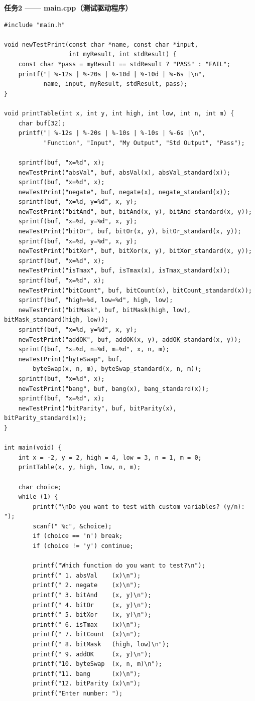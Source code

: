 \documentclass[12pt,a4paper]{ctexart}
\begin{document}
\vspace{0.3cm}
\textbf{任务2 —— main.cpp（测试驱动程序）}

\begin{lstlisting}[basicstyle=\ttfamily\zihao{5},lineskip=-1pt]
#include "main.h"

void newTestPrint(const char *name, const char *input,
                  int myResult, int stdResult) {
    const char *pass = myResult == stdResult ? "PASS" : "FAIL";
    printf("| %-12s | %-20s | %-10d | %-10d | %-6s |\n",
           name, input, myResult, stdResult, pass);
}

void printTable(int x, int y, int high, int low, int n, int m) {
    char buf[32];
    printf("| %-12s | %-20s | %-10s | %-10s | %-6s |\n",
           "Function", "Input", "My Output", "Std Output", "Pass");

    sprintf(buf, "x=%d", x);
    newTestPrint("absVal", buf, absVal(x), absVal_standard(x));
    sprintf(buf, "x=%d", x);
    newTestPrint("negate", buf, negate(x), negate_standard(x));
    sprintf(buf, "x=%d, y=%d", x, y);
    newTestPrint("bitAnd", buf, bitAnd(x, y), bitAnd_standard(x, y));
    sprintf(buf, "x=%d, y=%d", x, y);
    newTestPrint("bitOr", buf, bitOr(x, y), bitOr_standard(x, y));
    sprintf(buf, "x=%d, y=%d", x, y);
    newTestPrint("bitXor", buf, bitXor(x, y), bitXor_standard(x, y));
    sprintf(buf, "x=%d", x);
    newTestPrint("isTmax", buf, isTmax(x), isTmax_standard(x));
    sprintf(buf, "x=%d", x);
    newTestPrint("bitCount", buf, bitCount(x), bitCount_standard(x));
    sprintf(buf, "high=%d, low=%d", high, low);
    newTestPrint("bitMask", buf, bitMask(high, low), bitMask_standard(high, low));
    sprintf(buf, "x=%d, y=%d", x, y);
    newTestPrint("addOK", buf, addOK(x, y), addOK_standard(x, y));
    sprintf(buf, "x=%d, n=%d, m=%d", x, n, m);
    newTestPrint("byteSwap", buf,
        byteSwap(x, n, m), byteSwap_standard(x, n, m));
    sprintf(buf, "x=%d", x);
    newTestPrint("bang", buf, bang(x), bang_standard(x));
    sprintf(buf, "x=%d", x);
    newTestPrint("bitParity", buf, bitParity(x), bitParity_standard(x));
}

int main(void) {
    int x = -2, y = 2, high = 4, low = 3, n = 1, m = 0;
    printTable(x, y, high, low, n, m);

    char choice;
    while (1) {
        printf("\nDo you want to test with custom variables? (y/n): ");
        scanf(" %c", &choice);
        if (choice == 'n') break;
        if (choice != 'y') continue;

        printf("Which function do you want to test?\n");
        printf(" 1. absVal    (x)\n");
        printf(" 2. negate    (x)\n");
        printf(" 3. bitAnd    (x, y)\n");
        printf(" 4. bitOr     (x, y)\n");
        printf(" 5. bitXor    (x, y)\n");
        printf(" 6. isTmax    (x)\n");
        printf(" 7. bitCount  (x)\n");
        printf(" 8. bitMask   (high, low)\n");
        printf(" 9. addOK     (x, y)\n");
        printf("10. byteSwap  (x, n, m)\n");
        printf("11. bang      (x)\n");
        printf("12. bitParity (x)\n");
        printf("Enter number: ");


\end{lstlisting}
\end{document}
